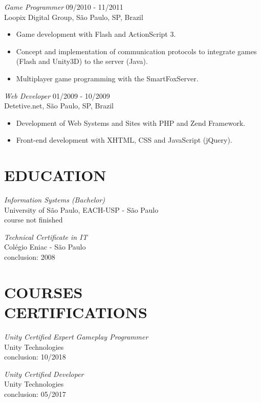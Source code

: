 \documentclass[line,margin]{res}
\begin{document}
\begin{resume}
                {\sl Game Programmer} \hfill 09/2010 - 11/2011 \\
                Loopix Digital Group, São Paulo, SP, Brazil
                 \begin{itemize}  \itemsep 1.25pt
                 \item Game development with Flash and ActionScript 3.
                 \item Concept and implementation of communication protocols to integrate games (Flash and Unity3D) to the server (Java).
                 \item Multiplayer game programming with the SmartFoxServer.
                 \end{itemize}
 
                {\sl Web Developer} \hfill 01/2009 - 10/2009 \\
                Detetive.net, São Paulo, SP, Brazil
                 \begin{itemize}  \itemsep 1.25pt
                 \item Development of Web Systems and Sites with PHP and Zend Framework.
                 \item Front-end development with XHTML, CSS and JavaScript (jQuery).
                 \end{itemize} 

\section{EDUCATION} {\sl Information Systems (Bachelor)} \\
                University of São Paulo, EACH-USP - São Paulo \\
                course not finished
		
		{\sl Technical Certificate in IT} \\
	            Colégio Eniac - São Paulo \\
	            conclusion: 2008
                
\section{COURSES \\ CERTIFICATIONS}   
           {\sl Unity Certified Expert Gameplay Programmer } \\
                Unity Technologies \\
			    conclusion: 10/2018

           {\sl Unity Certified Developer } \\
                Unity Technologies \\
			    conclusion: 05/2017
			

\end{resume}
\end{document}
